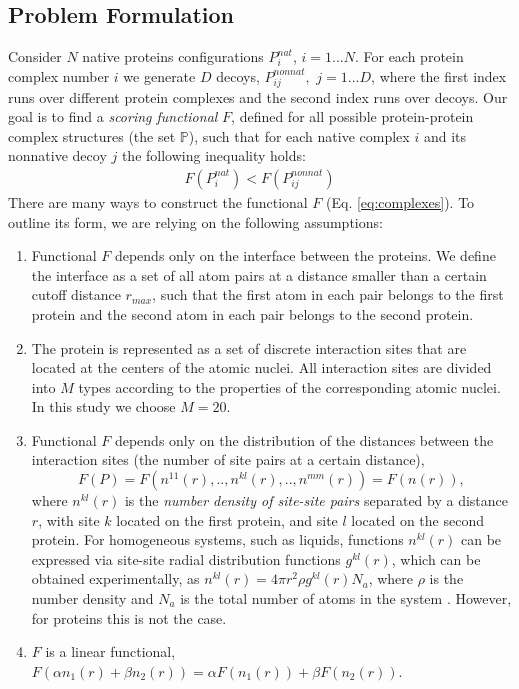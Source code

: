 \subsection{Problem Formulation}
Consider $N$ native  proteins configurations $P_{i}^{nat}$, $i=1...N$.
For each protein complex number $i$ we generate $D$ decoys, $P_{ij}^{nonnat},$ $j=1...D$, where the first index runs over different protein 
complexes and the second index runs over decoys. 
Our goal is to find  a \emph{scoring functional} $F$, defined for all 
possible protein-protein complex
structures (the set $\mathbb{P}$), such that for each native complex $i$ and its nonnative decoy $j$ the following inequality holds: 
\begin{eqnarray}
\label{eq:complexes}
F(P_{i}^{nat}) < F(P_{ij}^{nonnat}) 
\end{eqnarray}
There are many ways to construct the functional $F$ (Eq. \ref{eq:complexes}). To outline its form, we are relying on the following assumptions:
\begin{enumerate}
\item Functional $F$ depends only on the interface between the proteins. We define the interface as a set of all atom pairs at a distance smaller 
than a certain cutoff distance  
$r_{max}$, such that the first atom in each pair belongs to the first protein and the second atom in each pair belongs to the second protein.

\item The protein is represented as a set of discrete interaction sites that are located at the centers of the atomic nuclei. All interaction sites are divided into $M$ types according to the properties of the corresponding atomic nuclei.
In this study we choose $M=20$.

\item Functional $F$ depends only on the distribution of the distances between the interaction sites (the number of site pairs at a certain distance),
%
\begin{equation}
F(P)=F(n^{11}(r),..,n^{kl}(r),..,n^{mm}(r)) = F(n(r))
,
\end{equation}
where $n^{kl}(r)$ is the \emph{number density of site-site pairs} separated by a distance $r$, with site $k$ located on the first protein, 
and site $l$ located on the second protein. For homogeneous systems, such as liquids,  functions $n^{kl}(r)$ can be expressed via 
site-site radial distribution functions $g^{kl}(r)$, which can be obtained experimentally, as $n^{kl}(r)=4\pi r^2 \rho g^{kl}(r) N_a$, where 
$\rho$ is the number density and $N_a$ is the total number of atoms in the system \cite{Hansen2006}. 
However, for proteins this is not the case. 

\item $F$ is a linear functional, $F(\alpha n_1(r) +\beta n_2(r)) = \alpha F( n_1(r)) +\beta F( n_2(r))$.
\end{enumerate}

